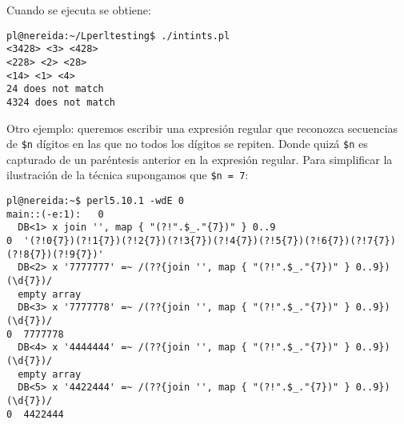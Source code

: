 \begin{rawhtml}
\end{rawhtml}%

Cuando se ejecuta se obtiene:
\begin{verbatim}
pl@nereida:~/Lperltesting$ ./intints.pl
<3428> <3> <428>
<228> <2> <28>
<14> <1> <4>
24 does not match
4324 does not match
\end{verbatim}


Otro ejemplo: queremos escribir una expresión regular que reconozca secuencias
de  \verb|$n| dígitos en las que no todos los dígitos se repiten. Donde quizá \verb|$n| es capturado
de un paréntesis anterior en la expresión regular. Para simplificar la ilustración
de la técnica supongamos que \verb|$n = 7|:
\begin{latexonly}
\begin{verbatim}
pl@nereida:~$ perl5.10.1 -wdE 0
main::(-e:1):   0
  DB<1> x join '', map { "(?!".$_."{7})" } 0..9
0  '(?!0{7})(?!1{7})(?!2{7})(?!3{7})(?!4{7})(?!5{7})(?!6{7})(?!7{7})(?!8{7})(?!9{7})'
  DB<2> x '7777777' =~ /(??{join '', map { "(?!".$_."{7})" } 0..9})(\d{7})/
  empty array
  DB<3> x '7777778' =~ /(??{join '', map { "(?!".$_."{7})" } 0..9})(\d{7})/
0  7777778
  DB<4> x '4444444' =~ /(??{join '', map { "(?!".$_."{7})" } 0..9})(\d{7})/
  empty array
  DB<5> x '4422444' =~ /(??{join '', map { "(?!".$_."{7})" } 0..9})(\d{7})/
0  4422444
\end{verbatim}
\end{latexonly}

\label{parrafo:palindromospostregexp}

